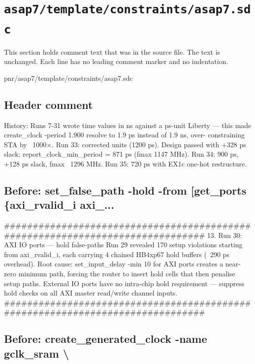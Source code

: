\section{\texttt{asap7/template/constraints/asap7.sdc}}\label{tm:pd:asap7-template-sdc}

This section holds comment text that was in the source file. The text is unchanged. Each line has no leading comment marker and no indentation.

\begin{relocated}{pnr/asap7/template/constraints/asap7.sdc}

\subsection*{Header comment}

\begin{textblock}
History:
  Runs 7-31 wrote time values in ns against a ps-unit Liberty — this made
  create_clock -period 1.900 resolve to 1.9 ps instead of 1.9 ns, over-
  constraining STA by ~1000×.
  Run 33: corrected units (1200 ps). Design passed with +328 ps slack;
  report_clock_min_period = 871 ps (fmax 1147 MHz). Run 34: 900 ps, +128 ps
  slack, fmax ~1296 MHz. Run 35: 720 ps with EX1c one-hot restructure.

\end{textblock}

\subsection*{Before: set\_false\_path -hold -from [get\_ports \{axi\_rvalid\_i axi\_...}

\begin{textblock}
##############################################################################
13. Run 30: AXI IO ports — hold false-paths
Run 29 revealed 170 setup violations starting from axi_rvalid_i, each
carrying 4 chained HB4xp67 hold buffers (~290 ps overhead). Root cause:
set_input_delay -min 10 for AXI ports creates a near-zero minimum path,
forcing the router to insert hold cells that then penalise setup paths.
External IO ports have no intra-chip hold requirement — suppress hold checks
on all AXI master read/write channel inputs.
##############################################################################
\end{textblock}

\subsection*{Before: create\_generated\_clock -name gclk\_sram \textbackslash{}}


\end{relocated}
